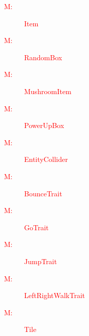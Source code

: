 \documentclass[12pt, titlepage]{article}
\newcounter{mnum}
\newcommand{\mthemnum}{M\themnum}
\begin{document}
\begin{description}
\item [\textcolor{red}{ \mthemnum \label{mItem}:}] \textcolor{red}{Item}
\item [\textcolor{red}{ \mthemnum \label{mRandomBox}:}] \textcolor{red}{RandomBox}
\item [\textcolor{red}{ \mthemnum \label{mMushroomItem}:}] \textcolor{red}{MushroomItem}
\item [\textcolor{red}{ \mthemnum \label{mPowerUpBox}:}] \textcolor{red}{PowerUpBox}
\item [\textcolor{red}{ \mthemnum \label{mEntityCollider}:}] \textcolor{red}{EntityCollider}
\item [\textcolor{red}{ \mthemnum \label{mBounceTrait}:}] \textcolor{red}{BounceTrait}
\item [\textcolor{red}{ \mthemnum \label{mGoTrait}:}] \textcolor{red}{GoTrait}
\item [\textcolor{red}{ \mthemnum \label{mJumpTrait}:}] \textcolor{red}{JumpTrait}
\item [\textcolor{red}{ \mthemnum \label{mLeftRightWalkTrait}:}] \textcolor{red}{LeftRightWalkTrait}
\item [\textcolor{red}{ \mthemnum \label{mTile}:}] \textcolor{red}{Tile}
\end{description}
\end{document}
